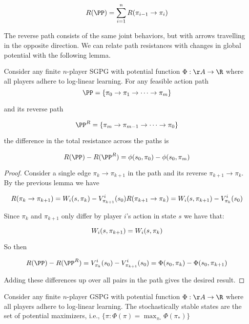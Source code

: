$$
R(\PP) = \sum_{i=1}^n R(\pi_{i-1} \rightarrow \pi_i)
$$

The reverse path consists of the same joint behaviors, but with arrows travelling in the opposite direction. We can relate path resistances with changes in global potential with the following lemma.


\begin{lem}
Consider any finite $n$-player SGPG with potential function $\Phi: \AA \rightarrow \R$ where all players adhere to log-linear learning. For any feasible action path
$$
\PP = \{\pi_0 \rightarrow \pi_1 \rightarrow \cdots \rightarrow \pi_m\}
$$

and its reverse path

$$
\PP^R = \{\pi_m \rightarrow \pi_{m-1} \rightarrow \cdots \rightarrow \pi_0\}
$$

the difference in the total resistance across the paths is

$$
R(\PP) - R(\PP^R) = \phi(s_0, \pi_0) - \phi(s_0, \pi_m)
$$
\end{lem}

\begin{proof}
Consider a single edge $\pi_k \rightarrow \pi_{k+1}$ in the path and its reverse $\pi_{k+1} \rightarrow \pi_k$. By the previous lemma we have

$$
R(\pi_k \rightarrow \pi_{k+1}) = W_i(s, \pi_k) - V^i_{\pi_{k+1}}(s_0) \\
R(\pi_{k+1} \rightarrow \pi_{k}) = W_i(s, \pi_{k+1}) - V^i_{\pi_k}(s_0)
$$

Since $\pi_k$ and $\pi_{k+1}$ only differ by player $i$'s action in state $s$ we have that:

$$
W_i(s, \pi_{k+1}) = W_i(s, \pi_{k}) \\
$$

So then

$$
R(\PP) - R(\PP^R) = V^i_{\pi_k}(s_0) - V^i_{\pi_{k+1}}(s_0) = \Phi(s_0, \pi_k) - \Phi(s_0, \pi_{k+1})
$$

Adding these differences up over all pairs in the path gives the desired result.
\end{proof}





\begin{prop}
Consider any finite $n$-player GSPG with potential function $\Phi: \AA \rightarrow \R$ where all players adhere to log-linear learning. The stochastically stable states are the set of potential maximizers, i.e., $\{ \pi : \Phi(\pi) = \max_{\pi_*} \Phi(\pi_*)  \}$
\end{prop}

